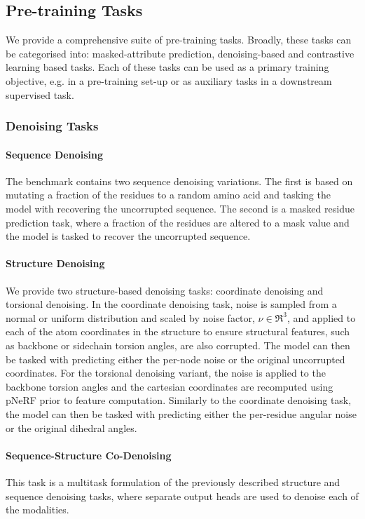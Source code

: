 \subsection{Pre-training Tasks}
We provide a comprehensive suite of pre-training tasks. Broadly, these tasks can be categorised into: masked-attribute prediction, denoising-based and contrastive learning based tasks. Each of these tasks can be used as a primary training objective, e.g. in a pre-training set-up or as auxiliary tasks in a downstream supervised task.

\subsubsection{Denoising Tasks}


\paragraph{Sequence Denoising} The benchmark contains two sequence denoising variations. The first is based on mutating a fraction of the residues to a random amino acid and tasking the model with recovering the uncorrupted sequence. The second is a masked residue prediction task, where a fraction of the residues are altered to a mask value and the model is tasked to recover the uncorrupted sequence.

\paragraph{Structure Denoising} We provide two structure-based denoising tasks: coordinate denoising and torsional denoising. In the coordinate denoising task, noise is sampled from a normal or uniform distribution and scaled by noise factor, $\nu \in \Re^3$, and applied to each of the atom coordinates in the structure to ensure structural features, such as backbone or sidechain torsion angles, are also corrupted. The model can then be tasked with predicting either the per-node noise or the original uncorrupted coordinates. For the torsional denoising variant, the noise is applied to the backbone torsion angles and the cartesian coordinates are recomputed using pNeRF \cite{AlQuraishi2019} prior to feature computation. Similarly to the coordinate denoising task, the model can then be tasked with predicting either the per-residue angular noise or the original dihedral angles.

\paragraph{Sequence-Structure Co-Denoising} This task is a multitask formulation of the previously described structure and sequence denoising tasks, where separate output heads are used to denoise each of the modalities.

